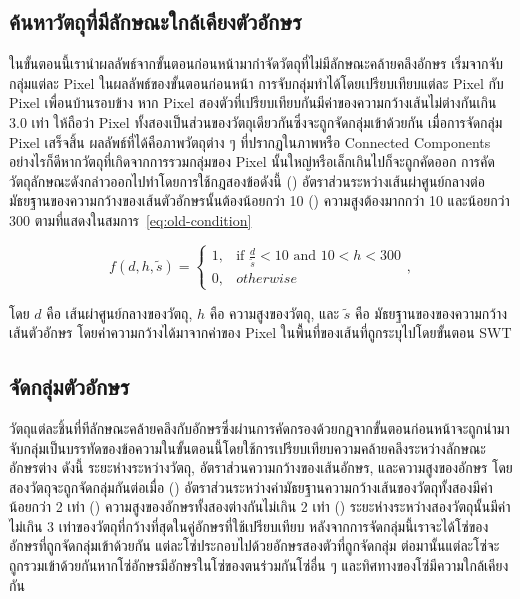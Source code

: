 \subsection{ค้นหาวัตถุที่มีลักษณะใกล้เคียงตัวอักษร}

ในขั้นตอนนี้เรานำผลลัพธ์จากขั้นตอนก่อนหน้ามากำจัดวัตถุที่ไม่มีลักษณะคล้ายคลึงอักษร เริ่มจากจับกลุ่มแต่ละ Pixel ในผลลัพธ์ของขั้นตอนก่อนหน้า การจับกลุ่มทำได้โดยเปรียบเทียบแต่ละ Pixel กับ Pixel เพื่อนบ้านรอบข้าง หาก Pixel สองตัวที่เปรียบเทียบกันมีค่าของความกว้างเส้นไม่ต่างกันเกิน 3.0  เท่า ให้ถือว่า Pixel ทั้งสองเป็นส่วนของวัตถุเดียวกันซึ่งจะถูกจัดกลุ่มเข้าด้วยกัน เมื่อการจัดกลุ่ม Pixel เสร็จสิ้น ผลลัพธ์ที่ได้คือภาพวัตถุต่าง ๆ ที่ปรากฏในภาพหรือ Connected Components อย่างไรก็ดีหากวัตถุที่เกิดจากการรวมกลุ่มของ Pixel นั้นใหญ่หรือเล็กเกินไปก็จะถูกคัดออก การคัดวัตถุลักษณะดังกล่าวออกไปทำโดยการใช้กฎสองข้อดังนี้ () อัตราส่วนระหว่างเส้นผ่าศูนย์กลางต่อมัธยฐานของความกว้างของเส้นตัวอักษรนั้นต้องน้อยกว่า 10  () ความสูงต้องมากกว่า 10 และน้อยกว่า 300 ตามที่แสดงในสมการ~\ref{eq:old-condition}


\begin{equation}
f(d, h, \tilde{s})= 
\begin{cases}
1, &\text{if } \frac{d}{\tilde{s}} < 10 \text{ and } 10 < h < 300\\
0, &otherwise
\end{cases},
\label{eq:old-condition}
\end{equation}

โดย $d$ คือ เส้นผ่าศูนย์กลางของวัตถุ, $h$ คือ ความสูงของวัตถุ, และ $\tilde{s}$ คือ มัธยฐานของของความกว้างเส้นตัวอักษร โดยค่าความกว้างได้มาจากค่าของ Pixel ในพื้นที่ของเส้นที่ถูกระบุไปโดยขั้นตอน SWT

\subsection{จัดกลุ่มตัวอักษร}

วัตถุแต่ละชิ้นที่ทีลักษณะคล้ายคลึงกับอักษรซึ่งผ่านการคัดกรองด้วยกฎจากขั้นตอนก่อนหน้าจะถูกนำมาจับกลุ่มเป็นบรรทัดของข้อความในขั้นตอนนี้โดยใช้การเปรียบเทียบความคล้ายคลึงระหว่างลักษณะอักษรต่าง ดังนี้ ระยะห่างระหว่างวัตถุ, อัตราส่วนความกว้างของเส้นอักษร, และความสูงของอักษร โดยสองวัตถุจะถูกจัดกลุ่มกันต่อเมื่อ () อัตราส่วนระหว่างค่ามัธยฐานความกว้างเส้นของวัตถุทั้งสองมีค่าน้อยกว่า 2 เท่า () ความสูงของอักษรทั้งสองต่างกันไม่เกิน 2 เท่า () ระยะห่างระหว่างสองวัตถุนั้นมีค่าไม่เกิน 3 เท่าของวัตถุที่กว้างที่สุดในคู่อักษรที่ใช้เปรียบเทียบ หลังจากการจัดกลุ่มนี้เราจะได้โซ่ของอักษรที่ถูกจัดกลุ่มเข้าด้วยกัน แต่ละโซ่ประกอบไปด้วยอักษรสองตัวที่ถูกจัดกลุ่ม ต่อมานั้นแต่ละโซ่จะถูกรวมเข้าด้วยกันหากโซ่อักษรมีอักษรในโซ่ของตนร่วมกันโซ่อื่น ๆ และทิศทางของโซ่มีความใกล้เคียงกัน

